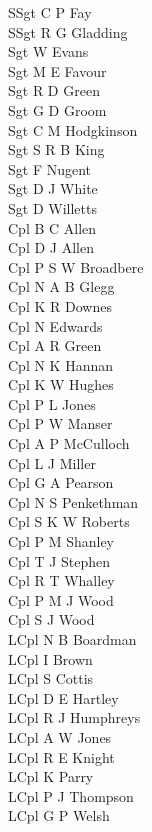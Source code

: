 \begin{multicols}{4}
  \scriptsize
  \noindent
  SSgt C P Fay \\
  SSgt R G Gladding \\
  Sgt W Evans \\
  Sgt M E Favour \\
  Sgt R D Green \\
  Sgt G D Groom \\
  Sgt C M Hodgkinson \\
  Sgt S R B King \\
  Sgt F Nugent \\
  Sgt D J White \\
  Sgt D Willetts \\
  Cpl B C Allen \\
  Cpl D J Allen \\
  Cpl P S W Broadbere \\
  Cpl N A B Glegg \\
  Cpl K R Downes \\
  Cpl N Edwards \\
  Cpl A R Green \\
  Cpl N K Hannan \\
  Cpl K W Hughes \\
  Cpl P L Jones \\
  Cpl P W Manser \\
  Cpl A P McCulloch \\
  Cpl L J Miller \\
  Cpl G A Pearson \\
  Cpl N S Penkethman \\
  Cpl S K W Roberts \\
  Cpl P M Shanley \\
  Cpl T J Stephen \\
  Cpl R T Whalley \\
  Cpl P M J Wood \\
  Cpl S J Wood \\
  LCpl N B Boardman \\
  LCpl I Brown \\
  LCpl S Cottis \\
  LCpl D E Hartley \\
  LCpl R J Humphreys \\
  LCpl A W Jones \\
  LCpl R E Knight \\
  LCpl K Parry \\
  LCpl P J Thompson \\
  LCpl G P Welsh \\

\end{multicols}

